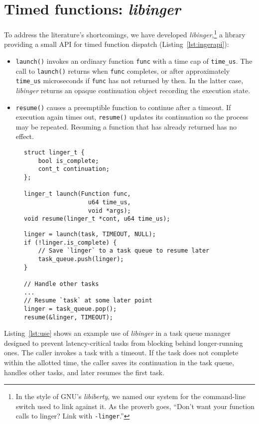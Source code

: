 \section{Timed functions: \textit{libinger}}
\label{sec:libinger}

To address the literature's shortcomings, we have developed
\textit{libinger},\footnote{In the style of GNU's \textit{libiberty}, we named our
system for the command-line switch used to link against it.  As the proverb goes,
``Don't want your function calls to linger?  Link with \texttt{-linger}.''}
a library providing a small API for timed function dispatch
(Listing~\ref{lst:ingerapi}):
\begin{itemize}
\item \texttt{launch()} invokes an ordinary function \texttt{func} with a
time cap of \texttt{time\_us}.  The call to \texttt{launch()} returns when
\texttt{func}
completes, or after approximately \texttt{time\_us} microseconds if \texttt{func} has
not returned
by then.  In the latter case, \textit{libinger} returns an opaque continuation
object recording the execution state.
\item \texttt{resume()} causes a preemptible function to continue after a timeout.
If execution again times out, \texttt{resume()} updates its continuation so the
process may be repeated.  Resuming a function that has already returned has no
effect.
\end{itemize}

\begin{figure}
\begin{lstlisting}[label=lst:ingerapi,caption=Preemptible functions core interface]
struct linger_t {
	bool is_complete;
	cont_t continuation;
};

linger_t launch(Function func,
                  u64 time_us,
                  void *args);
void resume(linger_t *cont, u64 time_us);
\end{lstlisting}
\begin{lstlisting}[label=lst:use, caption=Preemptible function usage example]
linger = launch(task, TIMEOUT, NULL);
if (!linger.is_complete) {
	// Save `linger` to a task queue to resume later
	task_queue.push(linger);
}

// Handle other tasks
...
// Resume `task` at some later point
linger = task_queue.pop();
resume(&linger, TIMEOUT);
\end{lstlisting}
\end{figure}

Listing~\ref{lst:use} shows an example use of \textit{libinger}
in a task queue manager designed to prevent latency-critical tasks from blocking
behind longer-running
ones. The caller invokes a task with a timeout. If the task does not complete
within the allotted time, the caller saves its continuation in the task queue,
handles other tasks, and later resumes the first task.
